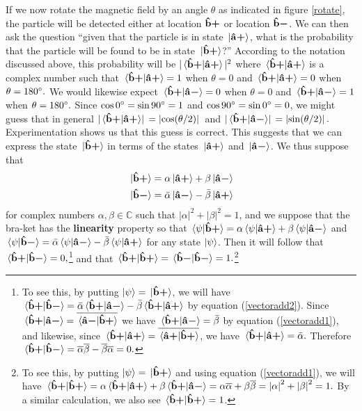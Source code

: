 If we now rotate the magnetic field by an angle $\theta$ as indicated in figure \ref{rotate}, the particle will be detected either at location $\vb{\hat{{b}}}\bm{+}$ or location $\vb{\hat{{b}}}\bm{-}$. We can then ask the question “given that the particle is in state $\ket*{\vb{\hat{{a}}}\bm{+}}$, what is the probability that the particle will be found to be in state $\ket*{\vb{\hat{{b}}}\bm{+}}$?” According to the notation discussed above, this probability will be $|\ip*{\uvbp{b}}{\uvbp{a}}|^2$ where $\ip*{\uvbp{b}}{\uvbp{a}}$ is a complex number such that $\ip*{\uvbp{b}}{\uvbp{a}}=1$ when $\theta =0$ and $\ip*{\uvbp{b}}{\uvbp{a}}=0$ when $\theta=180\degree.$ We would likewise expect $\ip*{\uvbp{b}}{\uvbm{a}}=0$ when $\theta =0$ and $\ip*{\uvbp{b}}{\uvbm{a}}=1$ when $\theta=180\degree.$ Since $\cos 0\degree = \sin 90\degree = 1$ and $\cos 90\degree = \sin 0\degree = 0$, we might guess that in general $\abs*{\ip*{\uvbp{b}}{\uvbp{a}}}=\abs*{\cos(\theta/2)}$ and  $\abs*{\ip*{\uvbp{b}}{\uvbm{a}}}=\abs*{\sin(\theta/2)}.$ Experimentation shows us that this guess is correct.
This suggests that we can express the state $\ket*{\vb{\hat{{b}}}\bm{+}}$ in terms of the states $\ket*{\vb{\hat{{a}}}\bm{+}}$ and $\ket*{\vb{\hat{{a}}}\bm{-}}$. We thus suppose that 
\begin{subequations}\label{vectoradd}
\begin{align}
\ket*{\vb{\hat{{b}}}\bm{+}}&=\alpha\ket*{\vb{\hat{{a}}}\bm{+}}+\beta\ket*{\vb{\hat{{a}}}\bm{-}}\label{vectoradd1}\\
\ket*{\vb{\hat{{b}}}\bm{-}}&=\bar{\alpha}\ket*{\vb{\hat{{a}}}\bm{-}}-\bar{\beta}\ket*{\vb{\hat{{a}}}\bm{+}}\label{vectoradd2}
\end{align} 
\end{subequations}
for complex numbers $\alpha, \beta \in \mathbb{C}$ such that $|\alpha|^2+|\beta|^2=1$, and we suppose that the bra-ket has the \textbf{linearity}\label{linearity} property so that  $\ip*{\psi}{\uvbp{b}}=\alpha\ip*{\psi}{\uvbp{a}}+\beta\ip*{\psi}{\uvbm{a}}$ and $\ip*{\psi}{\uvbm{b}}=\bar{\alpha}\ip*{\psi}{\uvbm{a}}-\bar{\beta}\ip*{\psi}{\uvbp{a}}$ for any state $\ket{\psi}$. Then  it will follow that  $\ip*{\uvbp{b}}{\uvbm{b}}=0,$\footnote{To see this, by putting $\ket{\psi}=\ket*{\vb{\hat{{b}}}\bm{+}}$, we will have $\ip*{\uvbp{b}}{\uvbm{b}}=\bar{\alpha}\ip*{\uvbp{b}}{\uvbm{a}}-\bar{\beta}\ip*{\uvbp{b}}{\uvbp{a}}$ by equation (\ref{vectoradd2}). Since  $\ip*{\uvbp{b}}{\uvbm{a}}=\overline{\ip*{\uvbm{a}}{\uvbp{b}}}$ we have $\ip*{\uvbp{b}}{\uvbm{a}}=\bar{\beta}$ by equation (\ref{vectoradd1}), and likewise, since $\ip*{\uvbp{b}}{\uvbp{a}}=\overline{\ip*{\uvbp{a}}{\uvbp{b}}}$, we have $\ip*{\uvbp{b}}{\uvbp{a}}=\bar{\alpha}.$  Therefore  $\ip*{\uvbp{b}}{\uvbm{b}}=\overline{\alpha}\overline{\beta}-\overline{\beta}{\overline{\alpha}}=0.$ }  and that $\ip*{\uvbp{b}}{\uvbp{b}}=\ip*{\uvbm{b}}{\uvbm{b}} = 1.$\footnote{To see this, by putting $\ket{\psi}=\ket*{\vb{\hat{{b}}}\bm{+}}$ and using equation (\ref{vectoradd1}), we will have $\ip*{\uvbp{b}}{\uvbp{b}}=\alpha\ip*{\uvbp{b}}{\uvbp{a}}+\beta\ip*{\uvbp{b}}{\uvbm{a}}=\alpha\overline{\alpha}+\beta\overline{\beta}=\abs{\alpha}^2+\abs{\beta}^2=1.$ By a similar calculation, we also see $\ip*{\uvbp{b}}{\uvbp{b}}=1$.}  
